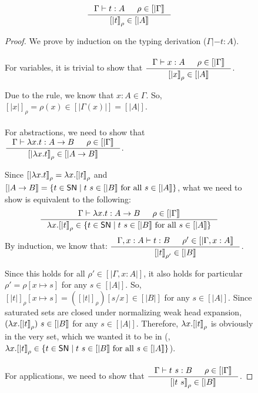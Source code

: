 \begin{figure}
\begin{theorem}
\[ \inference{\Gamma|- t:A & \rho \in [|\Gamma|]}{[|t|]_\rho \in [|A|]} \]
\end{theorem}
\begin{proof}
We prove by induction on the typing derivation ($\Gamma|- t:A$).
\paragraph{}
For variables, it is trivial to show that
$ \inference{\Gamma |- x:A & \rho \in [|\Gamma|]}{[|x|]_\rho \in [|A|]} $.

Due to the  rule, we know that $x:A \in \Gamma$.
So, $[|x|]_\rho =\rho(x)\in[|\Gamma(x)|] = [|A|]$.

\paragraph{}
For abstractions, we need to show that
$ \inference{\Gamma |- \l x.t : A -> B & \rho \in [|\Gamma|]}
	     {[|\l x.t|]_\rho \in [|A -> B|]} $.

Since $[|\lambda x.t|]_\rho = \lambda x.[|t|]_\rho$ and
$[|A -> B|] = \{ t\in \mathsf{SN} \mid t~s\in[|B|]~\text{for all}~s\in[|A|] \}$,
what we need to show is equivalent to the following:
\[ \inference{\Gamma |- \l x.t : A -> B & \rho \in [|\Gamma|]}
	     {\l x.[|t|]_\rho \in
		\{ t\in \SN \mid t~s\in[|B|] ~\text{for all}~ s\in[|A|] \} }
\]
By induction, we know that:
$ \inference{\Gamma,x:A |- t : B & \rho' \in [|\Gamma,x:A|]}
	     {[|t|]_{\rho'} \in [|B|]} $.

Since this holds for all $\rho' \in [|\Gamma,x:A|]$, it also holds
for particular $\rho' = \rho[x \mapsto s]$ for any $s \in [|A|]$.
So, $[|t|]_\rho[x\mapsto s] = ([|t|]_\rho)[s/x]\in[|B|]$ for any $s\in[|A|]$.
Since saturated sets are closed under normalizing weak head expansion,
$(\lambda x.[|t|]_\rho)~s \in[|B|]$ for any $s\in[|A|]$.
Therefore, $\lambda x.[|t|]_\rho$ is obviously in the very set,
which we wanted it to be in (\ie,
$\lambda x.[|t|]_\rho\in\{t\in \mathsf{SN} \mid t~s\in[|B|] ~\text{for all}~ s\in[|A|]\}$).

\paragraph{}
For applications, we need to show that
$ \inference{\Gamma |- t~s : B & \rho\in[|\Gamma|]}{[|t~s|]_\rho \in [|B|]} $.


\end{proof}
\end{figure}
